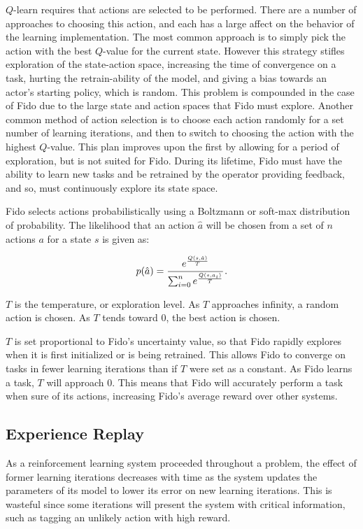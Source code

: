 $Q$-learn requires that actions are selected to be performed.
There are a number of approaches to choosing this action, and each has a large affect on the behavior of the learning implementation.
The most common approach is to simply pick the action with the best $Q$-value for the current state.
However this strategy stifles exploration of the state-action space, increasing the time of convergence on a task, hurting the retrain-ability of the model, and giving a bias towards an actor's starting policy, which is random.
This problem is compounded in the case of Fido due to the large state and action spaces that Fido must explore.
Another common method of action selection is to choose each action randomly for a set number of learning iterations, and then to switch to choosing the action with the highest $Q$-value.
This plan improves upon the first by allowing for a period of exploration, but is not suited for Fido.
During its lifetime, Fido must have the ability to learn new tasks and be retrained by the operator providing feedback, and so, must continuously explore its state space.

Fido selects actions probabilistically using a Boltzmann or soft-max distribution of probability.
The likelihood that an action $\hat{a}$ will be chosen from a set of $n$ actions $a$ for a state $s$ is given as:

\begin{equation}
	p(\hat{a}) = \cfrac{e^{\frac{Q(s, \hat{a})}{T}}}{\sum_{i=0}^{n}e^{\frac{Q(s, a_i)}{T}}}
	\,.
	\label{equ::boltzmann}
\end{equation}

$T$ is the temperature, or exploration level.
As $T$ approaches infinity, a random action is chosen.
As $T$ tends toward 0, the best action is chosen.

$T$ is set proportional to Fido's uncertainty value, so that Fido rapidly explores when it is first initialized or is being retrained. This allows Fido to converge on tasks in fewer learning iterations than if $T$ were set as a constant. As Fido learns a task, $T$ will approach 0. This means that Fido will accurately perform a task when sure of its actions, increasing Fido's average reward over other systems.

\subsection{Experience Replay}

As a reinforcement learning system proceeded throughout a problem, the effect of former learning iterations decreases with time as the system updates the parameters of its model to lower its error on new learning iterations. This is wasteful since some iterations will present the system with critical information, such as tagging an unlikely action with high reward.

